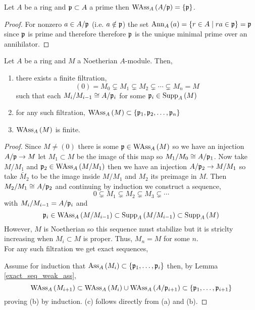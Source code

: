 \documentclass[12pt]{article}
\begin{document}
\begin{lemma}
Let $A$ be a ring and $\mathfrak{p} \subset A$ a prime then $\mathrm{WAss}_{A}\left(A / \mathfrak{p} \right) = \{ \mathfrak{p} \}$. 
\end{lemma}

\begin{proof}
For nonzero $a \in A / \mathfrak{p}$ (i.e. $a \notin \mathfrak{p}$) the set $\mathrm{Ann}_{A}\left(a\right) = \{ r \in A \mid ra \in \mathfrak{p} \} = \mathfrak{p}$ since $\mathfrak{p}$ is prime and therefore therefore $\mathfrak{p}$ is the unique minimal prime over an annihilator.
\end{proof}

\begin{proposition} \label{noetherian_finite_wass}
Let $A$ be a ring and $M$ a Noetherian $A$-module. Then,
\begin{enumerate}
\item there exists a finite filtration,
\[ (0) = M_0 \subsetneq M_1 \subsetneq M_2 \subsetneq \cdots \subsetneq M_n = M \]
such that each $M_{i} / M_{i-1} \cong A / \mathfrak{p}_{i}$ for some $\mathfrak{p}_i \in \mathrm{Supp}_{A} \left( M \right)$
\item for any such filtration, $\mathrm{WAss}_{A}\left(M \right) \subset \{ \mathfrak{p}_1, \mathfrak{p}_2, \dots, \mathfrak{p}_n\}$
\item $\mathrm{WAss}_{A}\left(M \right)$ is finite.
\end{enumerate}
\end{proposition}

\begin{proof}
Since $M \neq (0)$ there is some $\mathfrak{p} \in \mathrm{WAss}_{A}\left(M \right)$ so we have an injection $A / \mathfrak{p} \to M$ let $M_1 \subset M$ be the image of this map so $M_1 / M_0 \cong A / \mathfrak{p}_1$. Now take $M / M_1$ and $\mathfrak{p}_2 \in \mathrm{WAss}_{A}\left(M/M_1 \right)$ then we have an injection $A / \mathfrak{p}_2 \to M/M_1$ so take $\bar{M}_2$ to be the image inside $M/M_1$ and $M_2$ its preimage in $M$. Then $M_2 / M_1 \cong A / \mathfrak{p}_2$ and continuing by induction we construct a sequence,
\[ 0 \subsetneq M_1 \subsetneq M_2 \subsetneq M_3 \subsetneq \cdots \]
with $M_{i}/M_{i-1} = A / \mathfrak{p}_i$ and 
\[ \mathfrak{p}_i \in \mathrm{WAss}_{A}\left(M/M_{i-1} \right) \subset \mathrm{Supp}_{A}\left(M/M_{i-1} \right) \subset \mathrm{Supp}_{A}\left(M \right) \]
However, $M$ is Noetherian so this sequence must stabilize but it is striclty increasing when $M_i \subset M$ is proper. Thus, $M_n  = M$ for some $n$. 
\bigskip\\
For any such filtration we get exact sequences,
\begin{center}
\end{center}
Assume for induction that $\mathrm{Ass}_{A}\left( M_i \right) \subset \{\mathfrak{p}_1, \dots, \mathfrak{p}_i \}$ then, by Lemma \ref{exact_seq_weak_ass},
\[ \mathrm{WAss}_{A}\left(M_{i+1} \right) \subset \mathrm{WAss}_{A}\left(M_i \right) \cup \mathrm{WAss}_{A}\left(A / \mathfrak{p}_{i+1} \right) \subset \{\mathfrak{p}_1, \dots, \mathfrak{p}_{i+1} \} \]
proving (b) by induction. (c) follows directly from (a) and (b). 
\end{proof}
\end{document}
